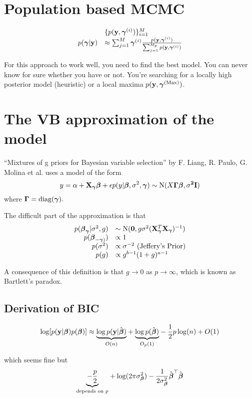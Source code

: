 \documentclass{amsart}
\begin{document}
\section{Population based MCMC}

\[
\begin{array}{rl}
		&\{ p({\bf y}, {\boldsymbol \gamma}^{(i)}) \}_{i=1}^M \\
	p({\boldsymbol \gamma} | {\bf y}) &\approx \sum_{j=1}^M {\boldsymbol \gamma}^{(i)} \frac{p({\bf y}, {\boldsymbol \gamma}^{(i)})}{\sum_{j=1}^{M_p} p({\bf y}, {\boldsymbol \gamma}^{(i)})}
\end{array}
\]

For this approach to work well, you need to find the best model. You can never know for sure whether you have
or not. You're searching for a locally high posterior model (heuristic) or a local maxima $p({\bf y}, {\boldsymbol \gamma}^{(\text{Max})})$.

\section{The VB approximation of the model}

\def \vGamma {\vectorfontone{\Gamma}}
\def \N {\text{N}}
``Mixtures of g priors for Bayesian variable selection'' by F. Liang, R. Paulo, G. Molina et al. uses a model
of the form
\[
	y = \alpha + \mX_\vgamma \vbeta + \epsilon \\
	p(y | \vbeta, \sigma^2, \vgamma) \sim \N(X \vGamma \vbeta, \sigma^2 I)
\]
where $\vGamma = \diag(\vgamma).$

The difficult part of the approximation is that
\[
\begin{array}{rl}
	p(\vbeta_\vgamma | \sigma^2, g) &\sim \N(\vzero, g \sigma^2 (\mX_\vgamma^T \mX_\vgamma)^{-1}) \\
	p(\vbeta_{-\vgamma)}) &\propto 1 \\
	p(\sigma^2) &\propto \sigma^{-2} \text{ (Jeffery's Prior)} \\
	p(g) &\propto g^{b-1} (1 + g)^{a-1} \\
\end{array}
\]

A consequence of this definition is that $g \to 0$ as $p \to \infty$, which is known as Bartlett's paradox.

\subsection{Derivation of BIC}

\[
	\log [ p({\bf y} | {\boldsymbol \beta}) p({\boldsymbol \beta}) ] \approx \underset{O(n)}{\underbrace{\log p({\bf y} | \hat{{\boldsymbol \beta}})}}
												+ \underset{O_p(1)}{\underbrace{\log p(\hat{{\boldsymbol \beta}})}}
												-  \frac{1}{2} p \log (n) + O(1)
\]

which seems fine but
\[
	\underset{\text{depends on $p$}}{\underbrace{-\frac{p}{2}}} + \log (2 \pi \sigma^2_{\boldsymbol \beta}) - \frac{1}{2 \sigma_{\boldsymbol \beta}^2} \hat{{\boldsymbol \beta}}^\top \hat{{\boldsymbol \beta}}
\]
\end{document}
